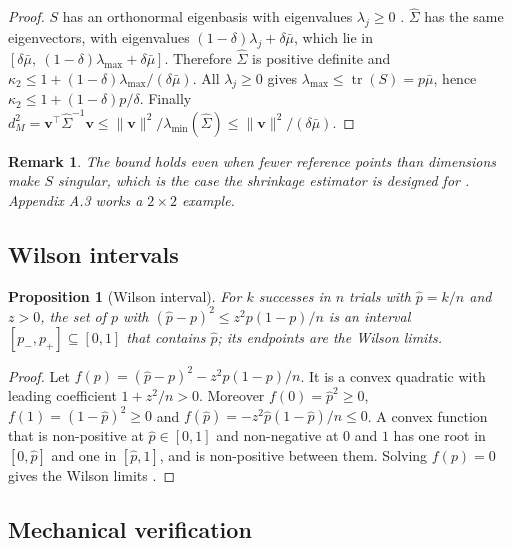 \documentclass[11pt,a4paper]{article}
\newtheorem{proposition}[theorem]{Proposition}
\newtheorem{remark}{Remark}
\begin{document}
\begin{proof}
$S$ has an orthonormal eigenbasis with eigenvalues $\lambda_j \ge 0$ \citep{horn2013}. $\hat{\Sigma}$ has the same eigenvectors, with eigenvalues $(1-\delta)\lambda_j + \delta\bar{\mu}$, which lie in $[\delta\bar{\mu},\ (1-\delta)\lambda_{\max} + \delta\bar{\mu}]$. Therefore $\hat{\Sigma}$ is positive definite and $\kappa_2 \le 1 + (1-\delta)\lambda_{\max}/(\delta\bar{\mu})$. All $\lambda_j \ge 0$ gives $\lambda_{\max} \le \operatorname{tr}(S) = p\bar{\mu}$, hence $\kappa_2 \le 1 + (1-\delta)p/\delta$. Finally $d_M^2 = \mathbf{v}^{\top}\hat{\Sigma}^{-1}\mathbf{v} \le \lVert\mathbf{v}\rVert^2/\lambda_{\min}(\hat{\Sigma}) \le \lVert\mathbf{v}\rVert^2/(\delta\bar{\mu})$.
\end{proof}

\begin{remark}
The bound holds even when fewer reference points than dimensions make $S$ singular, which is the case the shrinkage estimator is designed for \citep{ledoit2004}. Appendix A.3 works a $2 \times 2$ example.
\end{remark}

\subsection{Wilson intervals}

\begin{proposition}[Wilson interval]
For $k$ successes in $n$ trials with $\hat{p} = k/n$ and $z > 0$, the set of $p$ with $(\hat{p}-p)^2 \le z^2 p(1-p)/n$ is an interval $[p_-, p_+] \subseteq [0,1]$ that contains $\hat{p}$; its endpoints are the Wilson limits.
\end{proposition}

\begin{proof}
Let $f(p) = (\hat{p}-p)^2 - z^2p(1-p)/n$. It is a convex quadratic with leading coefficient $1 + z^2/n > 0$. Moreover $f(0) = \hat{p}^2 \ge 0$, $f(1) = (1-\hat{p})^2 \ge 0$ and $f(\hat{p}) = -z^2\hat{p}(1-\hat{p})/n \le 0$. A convex function that is non-positive at $\hat{p} \in [0,1]$ and non-negative at $0$ and $1$ has one root in $[0,\hat{p}]$ and one in $[\hat{p},1]$, and is non-positive between them. Solving $f(p)=0$ gives the Wilson limits \citep{wilson1927}.
\end{proof}

\subsection{Mechanical verification}
\end{document}
